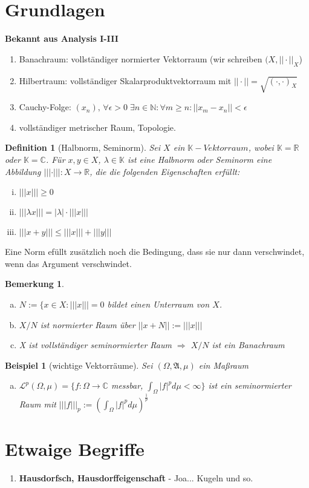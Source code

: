 \documentclass[ngerman]{article}
\newtheorem{definition}[section]{Definition}
\newtheorem{bem}[section]{Bemerkung}
\newtheorem{bsp}[section]{Beispiel}
\newcommand{\R}{\mathbb{R}}
\newcommand{\N}{\mathbb{N}}
\newcommand{\C}{\mathbb{C}}
\newcommand{\K}{\mathbb{K}}
\newcommand{\hA}{\mathfrak{A}}
\newcommand{\hL}{\mathcal{L}}
\begin{document}
\section{Grundlagen}
\textbf{Bekannt aus Analysis I-III}
\begin{enumerate}[-]
\item 
Banachraum: vollständiger normierter Vektorraum (wir schreiben $(X, ||\cdot ||_X$)

\item 
Hilbertraum: vollständiger Skalarproduktvektorraum mit $||\cdot || = \sqrt{(\cdot , \cdot )_X}$
\item
Cauchy-Folge: $(x_n),\,  \forall \epsilon > 0\; \exists n \in \N : \forall m \geq n : ||x_m-x_n||<\epsilon$
\item 
vollständiger metrischer Raum, Topologie.
\end{enumerate}

\begin{definition}[Halbnorm, Seminorm]
Sei $X$ ein $\K-Vektorraum$, wobei $\K = \R$ oder $\K = \C$. 
Für $x,y\in X$, $\lambda \in \K$ ist eine Halbnorm oder Seminorm eine Abbildung
$|||\cdot |||:X \rightarrow \R$, die die folgenden Eigenschaften erfüllt:
\begin{enumerate}[(i)]
\item $|||x|||\geq 0$
\item $|||\lambda x||| = |\lambda|\cdot |||x|||$
\item $|||x+y||| \leq |||x||| + |||y|||$
\end{enumerate}
\end{definition}

Eine Norm efüllt zusätzlich noch die Bedingung, dass sie nur dann verschwindet, wenn das Argument verschwindet.

\begin{bem}
\begin{enumerate}[(a)]
\item 
$N:=\{x\in X: |||x|||=0$ bildet einen Unterraum von $X$.
\item 
$X/N$ ist normierter Raum über $||x+N|| := |||x|||$
\item 
X ist vollständiger seminormierter Raum $\Rightarrow$ $X/N$ ist ein Banachraum 
\end{enumerate}
\end{bem}

\begin{bsp}[wichtige Vektorräume]
Sei $(\Omega,\hA,\mu)$ ein Maßraum
\begin{enumerate}[(a)]
\item $\hL^p(\Omega,\mu) = \{f:\Omega \rightarrow \C$ messbar, $\int_\Omega |f|^p d\mu < \infty \}$ ist ein seminormierter Raum mit $|||f|||_p := (\int_\Omega |f|^p d\mu )^{\frac{1}{p}}$

\end{enumerate}
\end{bsp}


\section*{Etwaige Begriffe}
\begin{enumerate}
\item
\textbf{Hausdorfsch, Hausdorffeigenschaft} -  Joa... Kugeln und so.

\end{enumerate}
\end{document}
